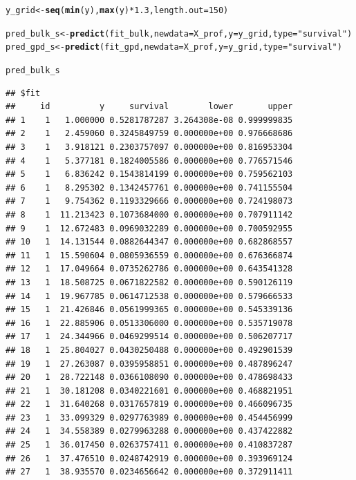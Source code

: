 \documentclass[article]{jss}\usepackage[]{graphicx}\usepackage[]{xcolor}
\makeatletter
\newcommand{\hlnum}[1]{\textcolor[rgb]{0.686,0.059,0.569}{#1}}%
\newcommand{\hlsng}[1]{\textcolor[rgb]{0.192,0.494,0.8}{#1}}%
\newcommand{\hlopt}[1]{\textcolor[rgb]{0,0,0}{#1}}%
\newcommand{\hldef}[1]{\textcolor[rgb]{0.345,0.345,0.345}{#1}}%
\newcommand{\hlkwb}[1]{\textcolor[rgb]{0.69,0.353,0.396}{#1}}%
\newcommand{\hlkwc}[1]{\textcolor[rgb]{0.333,0.667,0.333}{#1}}%
\newcommand{\hlkwd}[1]{\textcolor[rgb]{0.737,0.353,0.396}{\textbf{#1}}}%
\newenvironment{kframe}{%
 \def\at@end@of@kframe{}%
 \ifinner\ifhmode%
  \def\at@end@of@kframe{\end{minipage}}%
  \begin{minipage}{\columnwidth}%
 \fi\fi%
 \def\FrameCommand##1{\hskip\@totalleftmargin \hskip-\fboxsep
 \colorbox{shadecolor}{##1}\hskip-\fboxsep
     \hskip-\linewidth \hskip-\@totalleftmargin \hskip\columnwidth}%
 \MakeFramed {\advance\hsize-\width
   \@totalleftmargin\z@ \linewidth\hsize
   \@setminipage}}%
 {\par\unskip\endMakeFramed%
 \at@end@of@kframe}
\newenvironment{knitrout}{}{} %
\makeatother
\begin{document}
\begin{knitrout}
\color{fgcolor}\begin{kframe}
\begin{alltt}
\hldef{y_grid} \hlkwb{<-} \hlkwd{seq}\hldef{(}\hlkwd{min}\hldef{(y),} \hlkwd{max}\hldef{(y)} \hlopt{*} \hlnum{1.3}\hldef{,} \hlkwc{length.out} \hldef{=} \hlnum{150}\hldef{)}

\hldef{pred_bulk_s} \hlkwb{<-} \hlkwd{predict}\hldef{(fit_bulk,} \hlkwc{newdata} \hldef{= X_prof,} \hlkwc{y} \hldef{= y_grid,} \hlkwc{type} \hldef{=} \hlsng{"survival"}\hldef{)}
\hldef{pred_gpd_s}  \hlkwb{<-} \hlkwd{predict}\hldef{(fit_gpd,}  \hlkwc{newdata} \hldef{= X_prof,} \hlkwc{y} \hldef{= y_grid,} \hlkwc{type} \hldef{=} \hlsng{"survival"}\hldef{)}

\hldef{pred_bulk_s}
\end{alltt}
\begin{verbatim}
## $fit
##     id          y     survival        lower       upper
## 1    1   1.000000 0.5281787287 3.264308e-08 0.999999835
## 2    1   2.459060 0.3245849759 0.000000e+00 0.976668686
## 3    1   3.918121 0.2303757097 0.000000e+00 0.816953304
## 4    1   5.377181 0.1824005586 0.000000e+00 0.776571546
## 5    1   6.836242 0.1543814199 0.000000e+00 0.759562103
## 6    1   8.295302 0.1342457761 0.000000e+00 0.741155504
## 7    1   9.754362 0.1193329666 0.000000e+00 0.724198073
## 8    1  11.213423 0.1073684000 0.000000e+00 0.707911142
## 9    1  12.672483 0.0969032289 0.000000e+00 0.700592955
## 10   1  14.131544 0.0882644347 0.000000e+00 0.682868557
## 11   1  15.590604 0.0805936559 0.000000e+00 0.676366874
## 12   1  17.049664 0.0735262786 0.000000e+00 0.643541328
## 13   1  18.508725 0.0671822582 0.000000e+00 0.590126119
## 14   1  19.967785 0.0614712538 0.000000e+00 0.579666533
## 15   1  21.426846 0.0561999365 0.000000e+00 0.545339136
## 16   1  22.885906 0.0513306000 0.000000e+00 0.535719078
## 17   1  24.344966 0.0469299514 0.000000e+00 0.506207717
## 18   1  25.804027 0.0430250488 0.000000e+00 0.492901539
## 19   1  27.263087 0.0395958851 0.000000e+00 0.487896247
## 20   1  28.722148 0.0366108090 0.000000e+00 0.478698433
## 21   1  30.181208 0.0340221601 0.000000e+00 0.468821951
## 22   1  31.640268 0.0317657819 0.000000e+00 0.466096735
## 23   1  33.099329 0.0297763989 0.000000e+00 0.454456999
## 24   1  34.558389 0.0279963288 0.000000e+00 0.437422882
## 25   1  36.017450 0.0263757411 0.000000e+00 0.410837287
## 26   1  37.476510 0.0248742919 0.000000e+00 0.393969124
## 27   1  38.935570 0.0234656642 0.000000e+00 0.372911411

\end{verbatim}
\end{kframe}
\end{knitrout}
\end{document}
